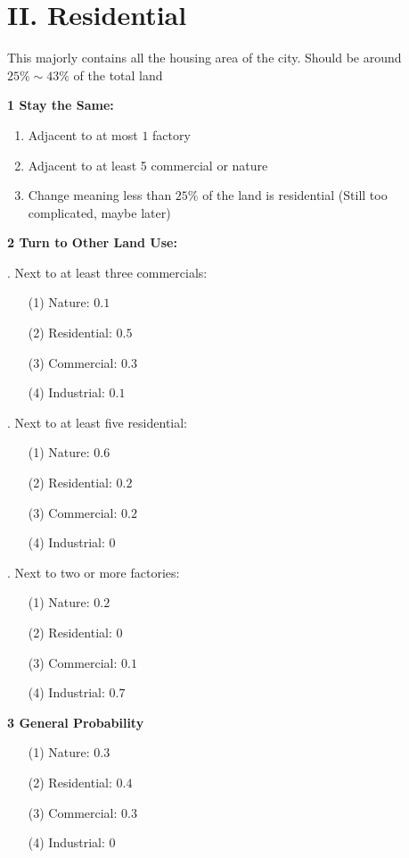 \documentclass[a4paper,12pt]{report}
\begin{document}
\section*{II. Residential}This majorly contains all the housing area of the city. Should be around $25\%\sim 43\%$ of the total land

\noindent
\textbf{1 Stay the Same: }

\begin{enumerate}
\item Adjacent to at most $1$ factory
\item Adjacent to at least 5 commercial or nature
\item Change meaning less than $25\%$ of the land is residential (Still too complicated, maybe later)
\end{enumerate}

\noindent
\textbf{2 Turn to Other Land Use:}

. Next to at least three commercials:
\begin{enumerate}
\item[(1)] Nature: $0.1$ 
\item[(2)] Residential: $0.5$
\item[(3)] Commercial: $0.3$
\item[(4)] Industrial: $0.1$
\end{enumerate}

. Next to at least five residential:
\begin{enumerate}
\item[(1)] Nature: $0.6$ 
\item[(2)] Residential: $0.2$
\item[(3)] Commercial: $0.2$
\item[(4)] Industrial: $0$
\end{enumerate}

. Next to two or more factories:
\begin{enumerate}
\item[(1)] Nature: $0.2$ 
\item[(2)] Residential: $0$
\item[(3)] Commercial: $0.1$
\item[(4)] Industrial: $0.7$
\end{enumerate}

\noindent
\textbf{3 General Probability}
\begin{enumerate}
\item[(1)] Nature: $0.3$ 
\item[(2)] Residential: $0.4$
\item[(3)] Commercial: $0.3$
\item[(4)] Industrial: $0$
\end{enumerate}
\end{document}

